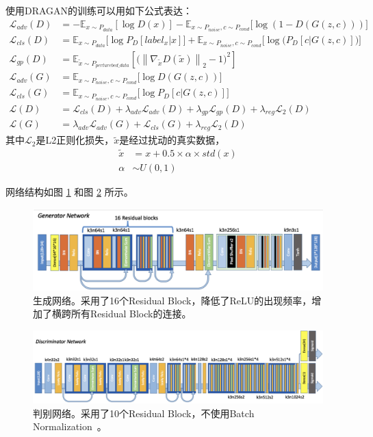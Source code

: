 \documentclass[a4paper,12pt,UTF8]{ctexart}
\newcommand{\norm}[1]{\left\lVert#1\right\rVert}
\newcommand{\kai}{\CJKfamily{zhkai}}	%
\begin{document}
使用DRAGAN的训练可以用如下公式表达：
%
\begin{align}
  \mathcal{L}_{adv}(D) &= -\mathbb{E}_{x\sim P_{data}}[\log D(x)] - \mathbb{E}_{x\sim P_{noise},c\sim P_{cond}}\big[\log(1-D(G(z,c)))\big] \\
  \mathcal{L}_{cls}(D) &= \mathbb{E}_{x\sim P_{data}}\big[\log P_D[label_x|x]\big] + \mathbb{E}_{x\sim P_{noise},c\sim P_{cond}}\Big[\log\big(P_D[c|G(z,c)]\big)\Big] \\
  \mathcal{L}_{gp}(D) &= \mathbb{E}_{\tilde{x}\sim P_{perturebed\_data}}\left[\big(\norm{\nabla_{\tilde{x}}D(\tilde{x})}_2-1\big)^2\right] \\
  \mathcal{L}_{adv}(G) &= \mathbb{E}_{x\sim P_{noise},c\sim P_{cond}}\big[\log D(G(z,c))\big] \\
  \mathcal{L}_{cls}(G) &= \mathbb{E}_{x\sim P_{noise},c\sim P_{cond}}\big[\log P_D[c|G(z,c)]\big] \\
  \mathcal{L}(D) &= \mathcal{L}_{cls}(D) + \lambda_{adv}\mathcal{L}_{adv}(D) + \lambda_{gp}\mathcal{L}_{gp}(D) + \lambda_{reg} \mathcal{L}_{2}(D) \\
  \mathcal{L}(G) &= \lambda_{adv}\mathcal{L}_{adv}(G) + \mathcal{L}_{cls}(G) + \lambda_{reg} \mathcal{L}_{2}(D)
\end{align}
%
其中$\mathcal{L}_{2}$是L2正则化损失，$\tilde{x}$是经过扰动的真实数据，
%
\begin{align}
  \tilde{x} & = x + 0.5 \times \alpha \times std(x) \\
  \alpha & \sim U(0, 1)
\end{align}

网络结构如图 \ref{fig:generator} 和图 \ref{fig:discriminator} 所示。

\begin{figure}[H]
  \centering
  \includegraphics[width=1\linewidth]{figs/g_net_moe.png}
  \caption{\kai 生成网络。采用了16个Residual Block，降低了ReLU的出现频率，增加了横跨所有Residual Block的连接。}
  \label{fig:generator}
\end{figure}

\begin{figure}[H]
  \centering
  \includegraphics[width=1\linewidth]{figs/mod_disc.png}
  \caption{\kai 判别网络。采用了10个Residual Block，不使用Batch Normalization~\cite{ioffe2015batch}。}
  \label{fig:discriminator}
\end{figure}
\end{document}
